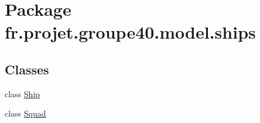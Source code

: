 \hypertarget{namespacefr_1_1projet_1_1groupe40_1_1model_1_1ships}{}\section{Package fr.\+projet.\+groupe40.\+model.\+ships}
\label{namespacefr_1_1projet_1_1groupe40_1_1model_1_1ships}
\subsection*{Classes}
\begin{DoxyCompactItemize}
\item 
class \hyperlink{classfr_1_1projet_1_1groupe40_1_1model_1_1ships_1_1_ship}{Ship}
\item 
class \hyperlink{classfr_1_1projet_1_1groupe40_1_1model_1_1ships_1_1_squad}{Squad}
\end{DoxyCompactItemize}
